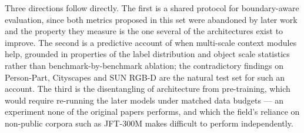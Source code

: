 \documentclass[journal]{IEEEtran}
\begin{document}
Three directions follow directly. The first is a shared protocol for boundary-aware
evaluation, since both metrics proposed in this set were abandoned by later work and
the property they measure is the one several of the architectures exist to improve.
The second is a predictive account of when multi-scale context modules help, grounded
in properties of the label distribution and object scale statistics rather than
benchmark-by-benchmark ablation; the contradictory findings on Person-Part,
Cityscapes and SUN RGB-D are the natural test set for such an account. The
third is the disentangling of architecture from pre-training, which would require
re-running the later models under matched data budgets --- an experiment none of the
original papers performs, and which the field's reliance on non-public corpora such as
JFT-300M makes difficult to perform independently.




%
%

\end{document}
